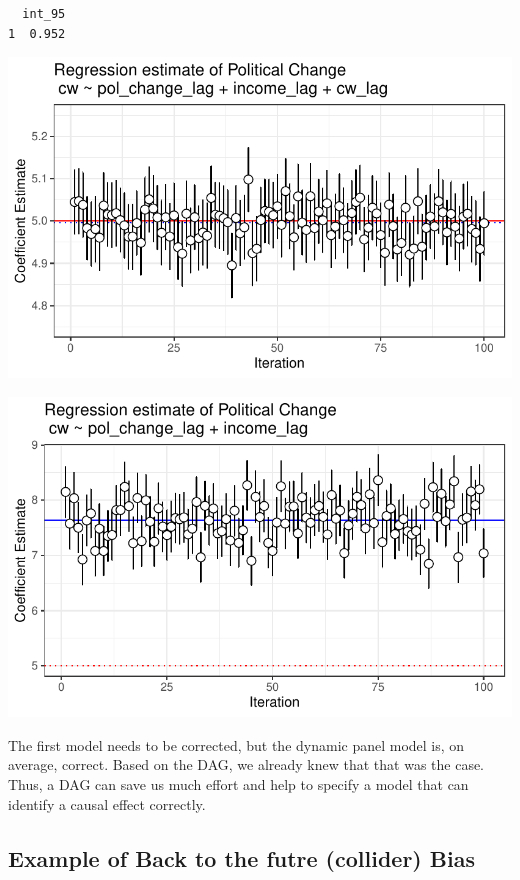 \documentclass[
  super,
  preprint,
  3p]{elsarticle}
\begin{document}
\begin{verbatim}
  int_95
1  0.952
\end{verbatim}

\includegraphics{Papers_beware_collider_files/figure-pdf/simulation 1-2.pdf}

\includegraphics{Papers_beware_collider_files/figure-pdf/simulation 1-3.pdf}

The first model needs to be corrected, but the dynamic panel model is,
on average, correct. Based on the DAG, we already knew that that was the
case. Thus, a DAG can save us much effort and help to specify a model
that can identify a causal effect correctly.

\hypertarget{example-of-back-to-the-futre-collider-bias}{%
\subsection{Example of Back to the futre (collider)
Bias}\label{example-of-back-to-the-futre-collider-bias}}
\end{document}
